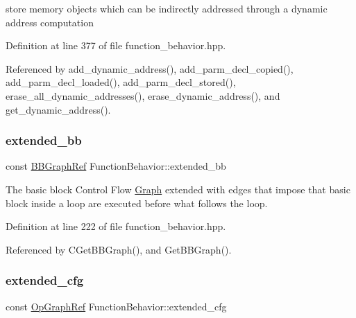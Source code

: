 store memory objects which can be indirectly addressed through a dynamic address computation 



Definition at line 377 of file function\+\_\+behavior.\+hpp.



Referenced by add\+\_\+dynamic\+\_\+address(), add\+\_\+parm\+\_\+decl\+\_\+copied(), add\+\_\+parm\+\_\+decl\+\_\+loaded(), add\+\_\+parm\+\_\+decl\+\_\+stored(), erase\+\_\+all\+\_\+dynamic\+\_\+addresses(), erase\+\_\+dynamic\+\_\+address(), and get\+\_\+dynamic\+\_\+address().

\mbox{\label{classFunctionBehavior_a5206698152a74e1dd8289fee701aab60}} 
\subsubsection{\texorpdfstring{extended\+\_\+bb}{extended\_bb}}
{\footnotesize\ttfamily const \hyperlink{basic__block_8hpp_a0e7f233d1b83cad0bfd5aa865f0d3532}{B\+B\+Graph\+Ref} Function\+Behavior\+::extended\+\_\+bb\hspace{0.3cm}{\ttfamily [private]}}



The basic block Control Flow \hyperlink{structGraph}{Graph} extended with edges that impose that basic block inside a loop are executed before what follows the loop. 



Definition at line 222 of file function\+\_\+behavior.\+hpp.



Referenced by C\+Get\+B\+B\+Graph(), and Get\+B\+B\+Graph().

\mbox{\label{classFunctionBehavior_a074a4d24af012f74808c5769d3c5b3c7}} 
\subsubsection{\texorpdfstring{extended\+\_\+cfg}{extended\_cfg}}
{\footnotesize\ttfamily const \hyperlink{op__graph_8hpp_aee97c95c40f791b60c451d9e29c72d39}{Op\+Graph\+Ref} Function\+Behavior\+::extended\+\_\+cfg\hspace{0.3cm}{\ttfamily [private]}}



